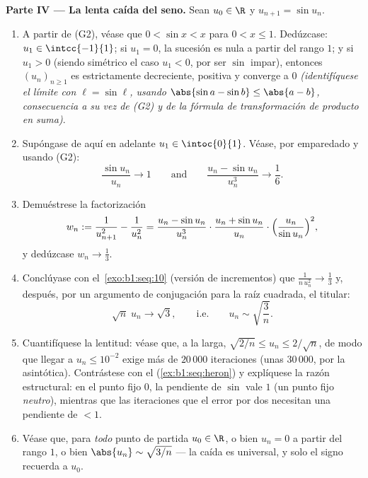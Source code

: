 \begin{problem}[{Problema del fin de semana --- el teorema de
Cesàro--Stolz y la asintótica $u_n \sim \sqrt{3/n}$ para
$u_{n+1} = \sin u_n$}]
\medskip
\noindent\textbf{Parte IV --- La lenta caída del seno.} Sean
$u_0 \in \R$ y $u_{n+1} = \sin u_n$.
\begin{enumerate}[resume]
  \item A partir de (G2), véase que $0 < \sin x < x$ para
        $0 < x \leq 1$. Dedúzcase: $u_1 \in \intcc{-1}{1}$; si
        $u_1 = 0$, la sucesión es nula a partir del rango $1$; y si
        $u_1 > 0$ (siendo simétrico el caso $u_1 < 0$, por ser $\sin$
        impar), entonces $(u_n)_{n \geq 1}$ es estrictamente
        decreciente, positiva y converge a $0$ \emph{(identifíquese el
        límite con $\ell = \sin \ell$, usando $\abs{\sin a - \sin b}
        \leq \abs{a - b}$, consecuencia a su vez de (G2) y de la
        fórmula de transformación de producto en suma)}.
  \item Supóngase de aquí en adelante $u_1 \in \intoc{0}{1}$. Véase,
        por emparedado y usando (G2):
        \[
        \frac{\sin u_n}{u_n} \to 1
        \qquad\text{and}\qquad
        \frac{u_n - \sin u_n}{u_n^{3}} \to \frac16 .
        \]
  \item Demuéstrese la factorización
        \[
        w_n := \frac{1}{u_{n+1}^{2}} - \frac{1}{u_n^{2}}
        = \frac{u_n - \sin u_n}{u_n^{3}} \cdot
        \frac{u_n + \sin u_n}{u_n} \cdot
        \Bigl(\frac{u_n}{\sin u_n}\Bigr)^{2},
        \]
        y dedúzcase $w_n \to \frac13$.
  \item Conclúyase con el~\cref{exo:b1:seq:10} (versión de
        incrementos) que $\frac{1}{n\,u_n^{2}} \to \frac13$ y,
        después, por un argumento de conjugación para la raíz
        cuadrada, el titular:
        \[
        \sqrt n\;u_n \longrightarrow \sqrt 3 ,
        \qquad\text{i.e.}\qquad
        u_n \sim \sqrt{\frac 3n} .
        \]
  \item Cuantifíquese la lentitud: véase que, a la larga,
        $\sqrt{2/n} \leq u_n \leq 2/\sqrt n$, de modo que llegar a
        $u_n \leq 10^{-2}$ exige más de $20\,000$ iteraciones (unas
        $30\,000$, por la asintótica). Contrástese con el
         (\cref{ex:b1:seq:heron}) y explíquese la
        razón estructural: en el punto fijo $0$, la pendiente de
        $\sin$ vale $1$ (un punto fijo \emph{neutro}), mientras que
        las iteraciones que  el error por dos necesitan una
        pendiente de  $< 1$.
  \item Véase que, para \emph{todo} punto de partida $u_0 \in \R$, o
        bien $u_n = 0$ a partir del rango $1$, o bien
        $\abs{u_n} \sim \sqrt{3/n}$ --- la caída es universal, y solo
        el signo recuerda a $u_0$.
\end{enumerate}


\end{problem}
